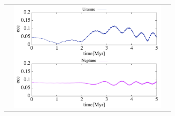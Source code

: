 \documentclass[11pt,a4paper,oneside,onecolumn]{jarticle}
\begin{document}
\begin{figure}[H]
\begin{tabular}{ccc}
\begin{minipage}[t]{0.1\hsize}
\end{minipage} &
\begin{minipage}[t]{0.45\hsize}
\centering
\includegraphics[width=8cm]{./image/Move500kyr_ecc_5Myr_URANEP.pdf}
\end{minipage}
%
\end{tabular}
\caption{\label{}}
\end{figure}
\end{document}
